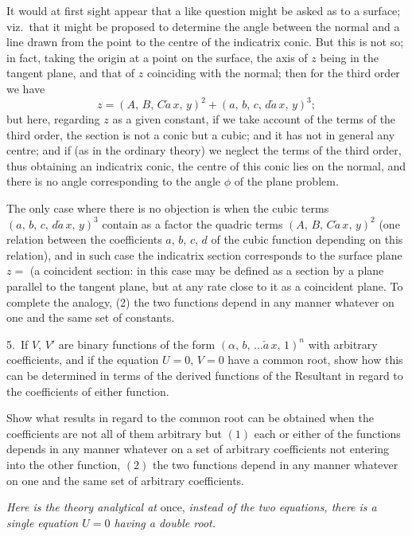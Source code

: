 \documentclass[11pt,a4paper]{book}
\begin{document}
It would at first sight appear that a like question might be asked as to a
surface; viz.\ that it might be proposed to determine the angle between the normal
and a line drawn from the point to the centre of the indicatrix conic. But this is
not so; in fact, taking the origin at a point on the surface, the axis of $z$ being
in the tangent plane, and that of $z$ coinciding with the normal; then for the third
order we have
\[
z = (A,\,B,\,C\check{a}\,x,\,y)^2 + (a,\,b,\,c,\,d\check{a}\,x,\,y)^3;
\]
but here, regarding $z$ as a given constant, if we take account of the terms of the
third order, the section is not a conic but a cubic; and it has not in general any
centre; and if (as in the ordinary theory) we neglect the terms of the third order,
thus obtaining an indicatrix conic, the centre of this conic lies on the normal, and
there is no angle corresponding to the angle $\phi$ of the plane problem.

The only case where there is no objection is when the cubic terms $(a,\,b,\,c,\,d\check{a}\,x,\,y)^3$
contain as a factor the quadric terms $(A,\,B,\,C\check{a}\,x,\,y)^2$ (one relation between the
coefficients $a$, $b$, $c$, $d$ of the cubic function depending on this relation), and
in such case the indicatrix section corresponds to the surface plane $z = $ (a coincident
section: in this case may be defined as a section by a plane parallel to the tangent
plane, but at any rate close to it as a coincident plane. To complete the analogy,
(2) the two functions depend in any manner whatever on one and the same set of
constants.

\smallskip
\noindent\textsc{5.}\, If $V$, $V'$ are binary functions of the form $(\alpha,\,b,\,\ldots\check{a}\,x,\,1)^n$ with arbitrary
coefficients, and if the equation $U=0$, $V=0$ have a common root, show how this can
be determined in terms of the derived functions of the Resultant in regard to the
coefficients of either function.

Show what results in regard to the common root can be obtained when the coefficients
are not all of them arbitrary but $(1)$ each or either of the functions depends in any
manner whatever on a set of arbitrary coefficients not entering into the other function,
$(2)$ the two functions depend in any manner whatever on one and the same set of
arbitrary coefficients.

\textit{Here is the theory analytical at} once, \textit{instead of the two equations, there is a single
equation $U = 0$ having a double root.}
\end{document}
